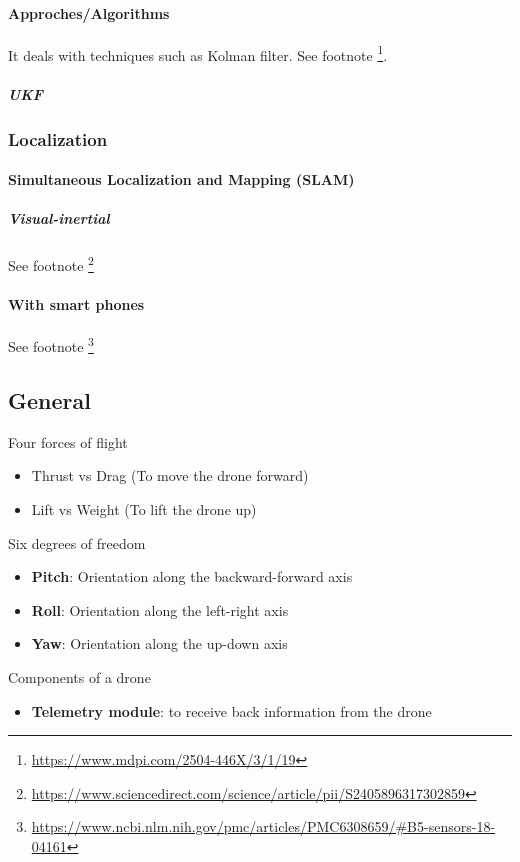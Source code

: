 \documentclass{article}
\begin{document}
			\paragraph{Approches/Algorithms}
			It deals with techniques such as Kolman filter. 
			See footnote \footnote{\url{https://www.mdpi.com/2504-446X/3/1/19}}. 
				\subparagraph{UKF}
			\subsubsection{Localization}
				\paragraph{Simultaneous Localization and Mapping (SLAM)}
					\subparagraph{Visual-inertial }
					\cite{nikolic-2014-a-synchronized-visual-inertial-sensor-system-with-fpga-pre-processing-for-accurate-real-time-slam}
					\cite{bloesch-2015-robust-visual-inertial-odometry-using-a-direct-ekf-based-approach}
					See footnote \footnote{\url{https://www.sciencedirect.com/science/article/pii/S2405896317302859}}
				\paragraph{With smart phones}
					See footnote \footnote{\url{https://www.ncbi.nlm.nih.gov/pmc/articles/PMC6308659/#B5-sensors-18-04161}}
			
		\subsection{General}
			\cite{powers-2015-quadrotor-kinematics-and-dynamics}
			Four forces of flight
			\begin{itemize}
				\item Thrust vs Drag (To move the drone forward)
				\item Lift vs Weight (To lift the drone up)
			\end{itemize}
			
			Six degrees of freedom
			\begin{itemize}
				\item \textbf{Pitch}: Orientation along the backward-forward axis 
				\item \textbf{Roll}: Orientation along the left-right axis
				\item \textbf{Yaw}: Orientation along the up-down axis
			\end{itemize}
			
			Components of a drone
			\begin{itemize}
				\item \textbf{Telemetry module}: to receive back information from the drone
			\end{itemize}
		
\end{document}
